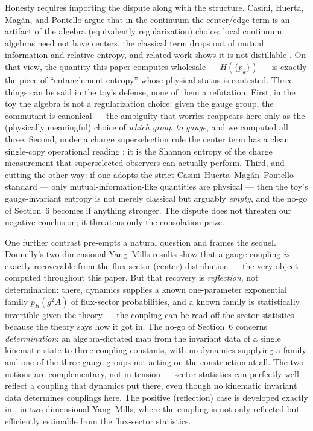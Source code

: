 \documentclass[11pt]{article}
\begin{document}
Honesty requires importing the dispute along with the structure. Casini, Huerta, Mag\'an, and Pontello \cite{chmp} argue that in the continuum the center/edge term is an artifact of the algebra (equivalently regularization) choice: local continuum algebras need not have centers, the classical term drops out of mutual information and relative entropy, and related work shows it is not distillable \cite{soni, moitra}. On that view, the quantity this paper computes wholesale --- $H(\{p_k\})$ --- is exactly the piece of ``entanglement entropy'' whose physical status is contested. Three things can be said in the toy's defense, none of them a refutation. First, in the toy the algebra is not a regularization choice: given the gauge group, the commutant is canonical --- the ambiguity that worries \cite{chmp} reappears here only as the (physically meaningful) choice of \emph{which group to gauge}, and we computed all three. Second, under a charge superselection rule the center term has a clean single-copy operational reading \cite{brs}: it is the Shannon entropy of the charge measurement that superselected observers can actually perform. Third, and cutting the other way: if one adopts the strict Casini--Huerta--Mag\'an--Pontello standard --- only mutual-information-like quantities are physical --- then the toy's gauge-invariant entropy is not merely classical but arguably \emph{empty}, and the no-go of Section~6 becomes if anything stronger. The dispute does not threaten our negative conclusion; it threatens only the consolation prize.

One further contrast pre-empts a natural question and frames the sequel. Donnelly's two-dimensional Yang--Mills results \cite{donnelly12, donnelly14} show that a gauge coupling \emph{is} exactly recoverable from the flux-sector (center) distribution --- the very object computed throughout this paper. But that recovery is \emph{reflection}, not determination: there, dynamics supplies a known one-parameter exponential family $p_R(g^2 A)$ of flux-sector probabilities, and a known family is statistically invertible given the theory --- the coupling can be read off the sector statistics because the theory says how it got in. The no-go of Section~6 concerns \emph{determination}: an algebra-dictated map from the invariant data of a single kinematic state to three coupling constants, with no dynamics supplying a family and one of the three gauge groups not acting on the construction at all. The two notions are complementary, not in tension --- sector statistics can perfectly well reflect a coupling that dynamics put there, even though no kinematic invariant data determines couplings here. The positive (reflection) case is developed exactly in \cite{ym2companion}, in two-dimensional Yang--Mills, where the coupling is not only reflected but efficiently estimable from the flux-sector statistics.
\end{document}

